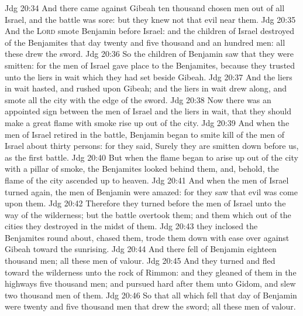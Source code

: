 \vs Jdg 20:34 And there came against Gibeah ten thousand chosen men out of all Israel, and the battle was sore: but they knew not that evil  near them.
\vs Jdg 20:35 And the \textsc{Lord} smote Benjamin before Israel: and the children of Israel destroyed of the Benjamites that day twenty and five thousand and an hundred men: all these drew the sword.
\vs Jdg 20:36 So the children of Benjamin saw that they were smitten: for the men of Israel gave place to the Benjamites, because they trusted unto the liers in wait which they had set beside Gibeah.
\vs Jdg 20:37 And the liers in wait hasted, and rushed upon Gibeah; and the liers in wait drew  along, and smote all the city with the edge of the sword.
\vs Jdg 20:38 Now there was an appointed sign between the men of Israel and the liers in wait, that they should make a great flame with smoke rise up out of the city.
\vs Jdg 20:39 And when the men of Israel retired in the battle, Benjamin began to smite  kill of the men of Israel about thirty persons: for they said, Surely they are smitten down before us, as  the first battle.
\vs Jdg 20:40 But when the flame began to arise up out of the city with a pillar of smoke, the Benjamites looked behind them, and, behold, the flame of the city ascended up to heaven.
\vs Jdg 20:41 And when the men of Israel turned again, the men of Benjamin were amazed: for they saw that evil was come upon them.
\vs Jdg 20:42 Therefore they turned  before the men of Israel unto the way of the wilderness; but the battle overtook them; and them which  out of the cities they destroyed in the midst of them.
\vs Jdg 20:43  they inclosed the Benjamites round about,  chased them,  trode them down with ease over against Gibeah toward the sunrising.
\vs Jdg 20:44 And there fell of Benjamin eighteen thousand men; all these  men of valour.
\vs Jdg 20:45 And they turned and fled toward the wilderness unto the rock of Rimmon: and they gleaned of them in the highways five thousand men; and pursued hard after them unto Gidom, and slew two thousand men of them.
\vs Jdg 20:46 So that all which fell that day of Benjamin were twenty and five thousand men that drew the sword; all these  men of valour.
